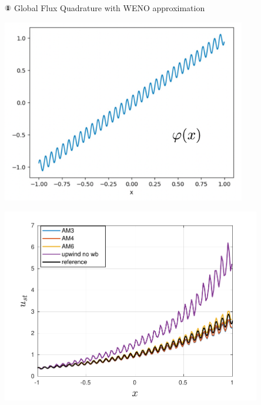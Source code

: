 \begin{frame}[t]{\includegraphics[width=0.3cm]{circle1} Global Flux Quadrature  with WENO approximation}
{\begin{minipage}{0.5\textwidth}
\centering\includegraphics[width=0.8\textwidth]{../figs/WENO-FD/figures/Burgers/perturbations/oscillation} 
\end{minipage}\hfill
\begin{minipage}{0.5\textwidth}
\centering\includegraphics[width=0.85\textwidth]{../figs/WENO-FD/figures/Burgers/perturbations/weno3_AM_stationary_n150} 
\end{minipage}
} 


\end{frame}

